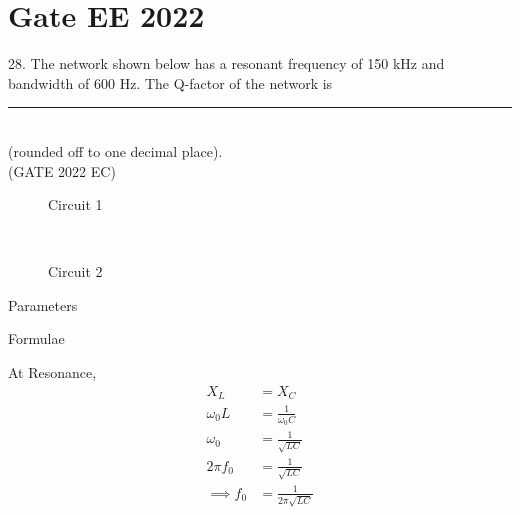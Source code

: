 \documentclass[journal,12pt,twocolumn]{IEEEtran}
\begin{document}


\vspace{3cm}

\title{}
\author{EE23BTECH11054 -  Sai Krishna Shanigarapu$^{*}$
}
\maketitle
\newpage
\bigskip

\section*{Gate EE 2022}
28. \hspace{2pt}The network shown below has a resonant frequency of 150 kHz and bandwidth of 600
Hz. The Q-factor of the network is \rule{1cm}{0.15mm}\\
(rounded off to one decimal place).\\
\hfill(GATE 2022 EC)\\
\begin{figure}[ht]
  \centering
  
      
  
  \caption{Circuit 1}
\end{figure}\\
\solution
\fi

\begin{figure}[ht]
  \centering
  
      

  \caption{Circuit 2}
\end{figure}


\begin{table}[ht]
    \centering
 
    

    \caption{Parameters}
    \label{tab:tab1_gate_ee_2022_28_054}
\end{table}

\begin{table}[ht]
    \centering

    

    \caption{Formulae}
    \label{tab:tab2_gate_ee_2022_28_054}
\end{table}

At Resonance, 
\begin{align}
    X_L & = X_C\\
    \omega_0 L &= \frac{1}{\omega_0 C}\\
    \omega_0 &= \frac{1}{\sqrt{LC}}\\
    2 \pi f_0 &= \frac{1}{\sqrt{LC}}\\
    \implies f_0 &= \frac{1}{2 \pi \sqrt{LC}} \label{eq:eq1_gate_ee_2022_28_054}    
\end{align}
\end{document}
